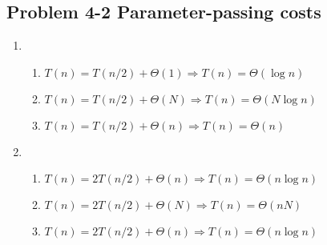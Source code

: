 \subsection*{Problem 4-2 Parameter-passing costs}
\begin{enumerate}
	\item	\begin{enumerate}
			\item	$T(n)=T(n/2)+\Theta(1) \Rightarrow T(n)=\Theta(\log n)$
			\item	$T(n)=T(n/2)+\Theta(N) \Rightarrow T(n)=\Theta(N \log n)$
			\item	$T(n)=T(n/2)+\Theta(n) \Rightarrow T(n)=\Theta(n)$
		\end{enumerate}
	\item	\begin{enumerate}
			\item	$T(n)=2T(n/2)+\Theta(n) \Rightarrow T(n)=\Theta(n \log n)$
			\item	$T(n)=2T(n/2)+\Theta(N) \Rightarrow T(n)=\Theta(nN)$
			\item	$T(n)=2T(n/2)+\Theta(n) \Rightarrow T(n)=\Theta(n \log n)$
		\end{enumerate}

\end{enumerate}

